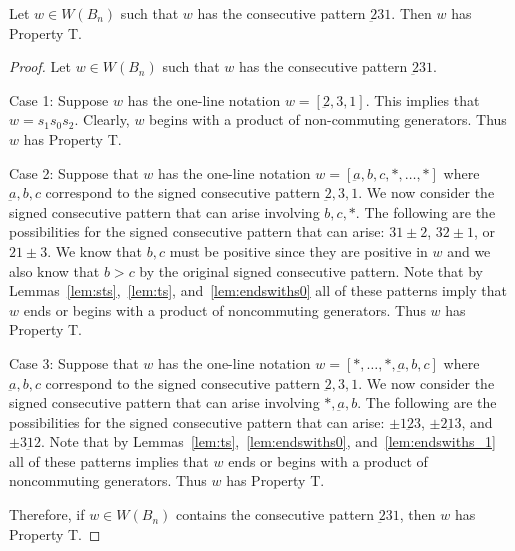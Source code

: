 \begin{lemma}\label{lem:231}
Let $w \in W(B_n)$ such that $w$ has the consecutive pattern $\underbar{2}31$. Then $w$ has Property T.
\begin{proof}
	Let $w \in W(B_n)$ such that $w$ has the consecutive pattern $\underbar{2}31$.
	
	Case 1: Suppose $w$ has the one-line notation $w=[\underbar{2},3,1]$. This implies that $w=s_1s_0s_2$. Clearly, $w$ begins with a product of non-commuting generators. Thus $w$ has Property T.
	
	Case 2: Suppose that $w$ has the one-line notation $w=[\underbar{a},b,c, \ast, \ldots, \ast]$ where $\underbar{a},b,c$ correspond to the signed consecutive pattern $\underbar{2},3,1$. We now consider the signed consecutive pattern that can arise involving $b,c, \ast$. The following are the possibilities for the signed consecutive pattern that can arise: $31\pm2$, $32 \pm1$, or $21\pm3$. We know that $b,c$ must be positive since they are positive in $w$ and we also know that $b>c$ by the original signed consecutive pattern. Note that by Lemmas~\ref{lem:sts},~\ref{lem:ts}, and~\ref{lem:endswiths0} all of these patterns imply that $w$ ends or begins with a product of noncommuting generators. Thus $w$ has Property T.
	
	Case 3: Suppose that $w$ has the one-line notation $w=[\ast, \ldots, \ast, \underbar{a},b,c]$ where $\underbar{a},b,c$ correspond to the signed consecutive pattern $\underbar{2},3,1$. We now consider the signed consecutive pattern that can arise involving $\ast, \underbar{a}, b$. The following are the possibilities for the signed consecutive pattern that can arise: $\pm1 \underbar{2} 3$, $\pm 2 \underbar{1} 3$, and $\pm 3 \underbar{1} 2$. Note that by Lemmas~\ref{lem:ts},~\ref{lem:endswiths0}, and~\ref{lem:endswiths_1} all of these patterns implies that $w$ ends or begins with a product of noncommuting generators. Thus $w$ has Property T. 

	Therefore, if $w \in W(B_n)$ contains the consecutive pattern $\underbar{2}31$, then $w$ has Property T.
\end{proof}	
\end{lemma}

